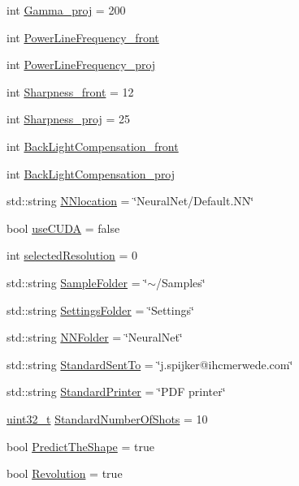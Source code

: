 \begin{DoxyCompactItemize}
\item 
int \hyperlink{class_soil_analyzer_1_1_soil_settings_a1d66dc760c4b2f857f8660d60c257b71}{Gamma\+\_\+proj} = 200
\item 
int \hyperlink{class_soil_analyzer_1_1_soil_settings_a4fa556e97efddb93d8d5e382ab33c6fd}{Power\+Line\+Frequency\+\_\+front}
\item 
int \hyperlink{class_soil_analyzer_1_1_soil_settings_a08370685977bf9a200a13da5008f743f}{Power\+Line\+Frequency\+\_\+proj}
\item 
int \hyperlink{class_soil_analyzer_1_1_soil_settings_a599f28eae821227f5c00aa24b1571b8d}{Sharpness\+\_\+front} = 12
\item 
int \hyperlink{class_soil_analyzer_1_1_soil_settings_a393383ada5fb2a451b89245de34b27de}{Sharpness\+\_\+proj} = 25
\item 
int \hyperlink{class_soil_analyzer_1_1_soil_settings_ae066beb7ff7d4274b5b370140cf3deb5}{Back\+Light\+Compensation\+\_\+front}
\item 
int \hyperlink{class_soil_analyzer_1_1_soil_settings_a34c82ebc3bd8920275fd9f38265d35d2}{Back\+Light\+Compensation\+\_\+proj}
\item 
std\+::string \hyperlink{class_soil_analyzer_1_1_soil_settings_a61bb233b0deaed4039b3eb05884a4854}{N\+Nlocation} = \char`\"{}Neural\+Net/Default.\+N\+N\char`\"{}
\item 
bool \hyperlink{class_soil_analyzer_1_1_soil_settings_adfeabd89b897cf220e3575e64c97b4fc}{use\+C\+U\+D\+A} = false
\item 
int \hyperlink{class_soil_analyzer_1_1_soil_settings_a115a9feb41cc836d28d4ae1ceb536356}{selected\+Resolution} = 0
\item 
std\+::string \hyperlink{class_soil_analyzer_1_1_soil_settings_adfd46a349d927988c955fa064fc7bf1a}{Sample\+Folder} = \char`\"{}$\sim$/Samples\char`\"{}
\item 
std\+::string \hyperlink{class_soil_analyzer_1_1_soil_settings_a2107a9c59b4b04e1edf148c5d5308d17}{Settings\+Folder} = \char`\"{}Settings\char`\"{}
\item 
std\+::string \hyperlink{class_soil_analyzer_1_1_soil_settings_a3c10433119931ebd347fb830c3020f39}{N\+N\+Folder} = \char`\"{}Neural\+Net\char`\"{}
\item 
std\+::string \hyperlink{class_soil_analyzer_1_1_soil_settings_ac5010d7e2c8019f090147f8b9d89cb95}{Standard\+Sent\+To} = \char`\"{}j.\+spijker@ihcmerwede.\+com\char`\"{}
\item 
std\+::string \hyperlink{class_soil_analyzer_1_1_soil_settings_a5cc51f50ef63440c6f65e2a9a6562be8}{Standard\+Printer} = \char`\"{}P\+D\+F printer\char`\"{}
\item 
\hyperlink{_soil_math_types_8h_a435d1572bf3f880d55459d9805097f62}{uint32\+\_\+t} \hyperlink{class_soil_analyzer_1_1_soil_settings_a290567ffd8fe54f1c800654395ca7a71}{Standard\+Number\+Of\+Shots} = 10
\item 
bool \hyperlink{class_soil_analyzer_1_1_soil_settings_a369593522ac29f7dfa48fd6ca2afebef}{Predict\+The\+Shape} = true
\item 
bool \hyperlink{class_soil_analyzer_1_1_soil_settings_a72cdc805222bbb57772cb3d9bba7555a}{Revolution} = true
\end{DoxyCompactItemize}
